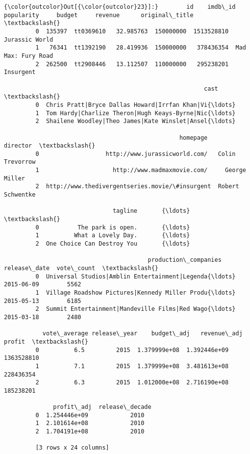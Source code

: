 \documentclass[11pt]{article}
\begin{document}
\begin{Verbatim}[commandchars=\\\{\}]
{\color{outcolor}Out[{\color{outcolor}23}]:}        id    imdb\_id  popularity     budget     revenue      original\_title  \textbackslash{}
         0  135397  tt0369610   32.985763  150000000  1513528810      Jurassic World   
         1   76341  tt1392190   28.419936  150000000   378436354  Mad Max: Fury Road   
         2  262500  tt2908446   13.112507  110000000   295238201           Insurgent   
         
                                                         cast  \textbackslash{}
         0  Chris Pratt|Bryce Dallas Howard|Irrfan Khan|Vi{\ldots}   
         1  Tom Hardy|Charlize Theron|Hugh Keays-Byrne|Nic{\ldots}   
         2  Shailene Woodley|Theo James|Kate Winslet|Ansel{\ldots}   
         
                                                  homepage          director  \textbackslash{}
         0                   http://www.jurassicworld.com/   Colin Trevorrow   
         1                     http://www.madmaxmovie.com/     George Miller   
         2  http://www.thedivergentseries.movie/\#insurgent  Robert Schwentke   
         
                               tagline       {\ldots}        \textbackslash{}
         0           The park is open.       {\ldots}         
         1          What a Lovely Day.       {\ldots}         
         2  One Choice Can Destroy You       {\ldots}         
         
                                         production\_companies release\_date  vote\_count  \textbackslash{}
         0  Universal Studios|Amblin Entertainment|Legenda{\ldots}   2015-06-09        5562   
         1  Village Roadshow Pictures|Kennedy Miller Produ{\ldots}   2015-05-13        6185   
         2  Summit Entertainment|Mandeville Films|Red Wago{\ldots}   2015-03-18        2480   
         
           vote\_average release\_year    budget\_adj   revenue\_adj      profit  \textbackslash{}
         0          6.5         2015  1.379999e+08  1.392446e+09  1363528810   
         1          7.1         2015  1.379999e+08  3.481613e+08   228436354   
         2          6.3         2015  1.012000e+08  2.716190e+08   185238201   
         
              profit\_adj  release\_decade  
         0  1.254446e+09            2010  
         1  2.101614e+08            2010  
         2  1.704191e+08            2010  
         
         [3 rows x 24 columns]
\end{Verbatim}
            
\end{document}
